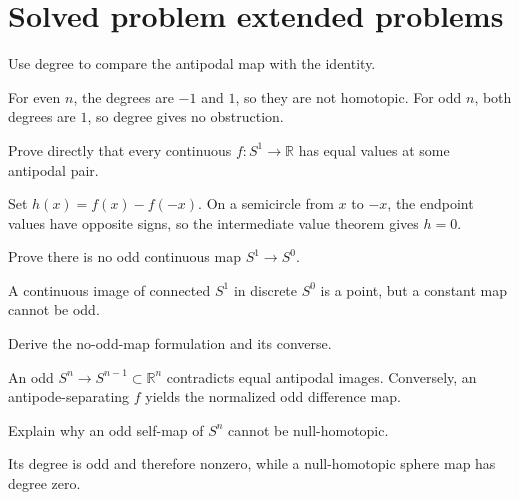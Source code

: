 \section{Solved problem extended problems}

\begin{problem}\label{prob:viii04-01}
Use degree to compare the antipodal map with the identity.
\end{problem}
\begin{solution}
For even \(n\), the degrees are \(-1\) and \(1\), so they are not homotopic.  For odd \(n\), both degrees are \(1\), so degree gives no obstruction.
\end{solution}

\begin{problem}\label{prob:viii04-02}
Prove directly that every continuous \(f:S^1\to\mathbb R\) has equal values at some antipodal pair.
\end{problem}
\begin{solution}
Set \(h(x)=f(x)-f(-x)\).  On a semicircle from \(x\) to \(-x\), the endpoint values have opposite signs, so the intermediate value theorem gives \(h=0\).
\end{solution}

\begin{problem}\label{prob:viii04-03}
Prove there is no odd continuous map \(S^1\to S^0\).
\end{problem}
\begin{solution}
A continuous image of connected \(S^1\) in discrete \(S^0\) is a point, but a constant map cannot be odd.
\end{solution}

\begin{problem}\label{prob:viii04-04}
Derive the no-odd-map formulation and its converse.
\end{problem}
\begin{solution}
An odd \(S^n\to S^{n-1}\subset\mathbb R^n\) contradicts equal antipodal images. Conversely, an antipode-separating \(f\) yields the normalized odd difference map.
\end{solution}

\begin{problem}\label{prob:viii04-05}
Explain why an odd self-map of \(S^n\) cannot be null-homotopic.
\end{problem}
\begin{solution}
Its degree is odd and therefore nonzero, while a null-homotopic sphere map has degree zero.
\end{solution}

